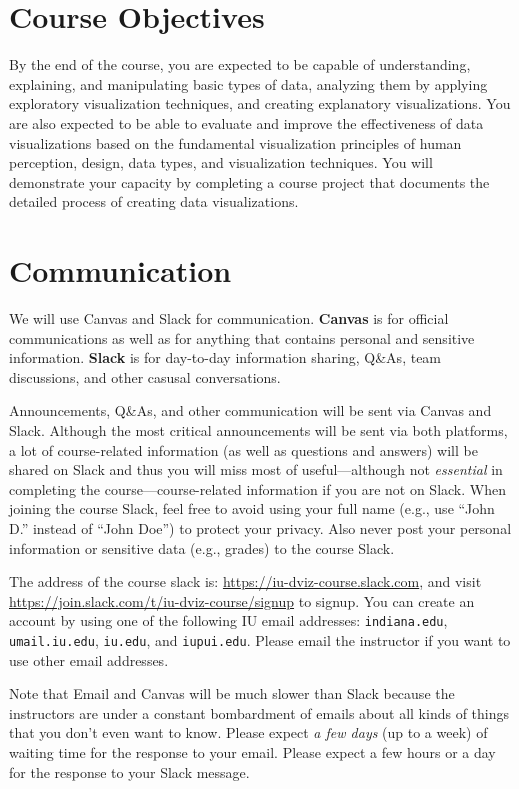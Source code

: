 \documentclass[11pt,article,oneside]{memoir} %
\begin{document}
\section{Course Objectives}%

By the end of the course, you are expected to be capable of understanding, explaining, and manipulating basic types of data, analyzing them by applying exploratory visualization techniques, and creating explanatory visualizations. 
You are also expected to be able to evaluate and improve the effectiveness of data visualizations based on the fundamental visualization principles of human perception, design, data types, and visualization techniques. 
You will demonstrate your capacity by completing a course project that documents the detailed process of creating data visualizations. 

\section{Communication} %

We will use Canvas and Slack for communication. \textbf{Canvas} is for official communications as well as for anything that contains personal and sensitive information. \textbf{Slack} is for day-to-day information sharing, Q\&As, team discussions, and other casusal conversations. 

Announcements, Q\&As, and other communication will be sent via Canvas and Slack. Although the most critical announcements will be sent via both platforms, a lot of course-related information (as well as questions and answers) will be shared on Slack and thus you will miss most of useful---although not \emph{essential} in completing the course---course-related information if you are not on Slack. 
When joining the course Slack, feel free to avoid using your full name (e.g., use ``John D.'' instead of ``John Doe'') to protect your privacy. 
Also never post your personal information or sensitive data (e.g., grades) to the course Slack. 

The address of the course slack is: \url{https://iu-dviz-course.slack.com}, and visit \url{https://join.slack.com/t/iu-dviz-course/signup} to signup.
You can create an account by using one of the following IU email addresses: \texttt{indiana.edu}, \texttt{umail.iu.edu}, \texttt{iu.edu}, and \texttt{iupui.edu}. Please email the instructor if you want to use other email addresses. 

Note that Email and Canvas will be much slower than Slack because the instructors are under a constant bombardment of emails about all kinds of things that you don't even want to know. Please expect \emph{a few days} (up to a week) of waiting time for the response to your email. Please expect a few hours or a day for the response to your Slack message. 
\end{document}

